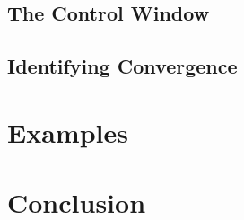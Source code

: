 \documentclass[12pt]{article}
\begin{document}

%
%
\subsection{The Control Window}
%
%



%
%
\subsection{Identifying Convergence}
%
%

%
%
\section{Examples}
%
%

%
%
\section{Conclusion}
%
%


%
%
%
%
\end{document}
